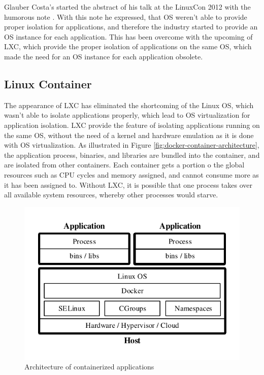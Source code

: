 Glauber Costa's started the abstract of his talk at the LinuxCon 2012 with the humorous note . With this note he expressed, that OS weren't able to provide proper isolation for applications, and therefore the industry started to provide an OS instance for each application. This has been overcome with the upcoming of LXC, which provide the proper isolation of applications on the same OS, which made the need for an OS instance for each application obsolete\cite{LxConCosta2012}.

\subsection{Linux Container}
\label{sec:docker-linux-container}
The appearance of LXC has eliminated the shortcoming of the Linux OS, which wasn't able to isolate applications properly, which lead to OS virtualization for application isolation. LXC provide the feature of isolating applications running on the same OS, without the need of a kernel and hardware emulation as it is done with OS virtualization. As illustrated in Figure \vref{fig:docker-container-architecture}, the application process, binaries, and libraries are bundled into the container, and are isolated from other containers. Each container gets a portion o the global resources such as CPU cycles and memory assigned, and cannot consume more as it has been assigned to. Without LXC, it is possible that one process takes over all available system resources, whereby other processes would starve.

\begin{figure}[htbp]
	\centering
	\includegraphics[scale=1]{images/docker-containerized-architecture.pdf}
	\caption{Architecture of containerized applications}
	\label{fig:docker-container-architecture}
\end{figure} 

